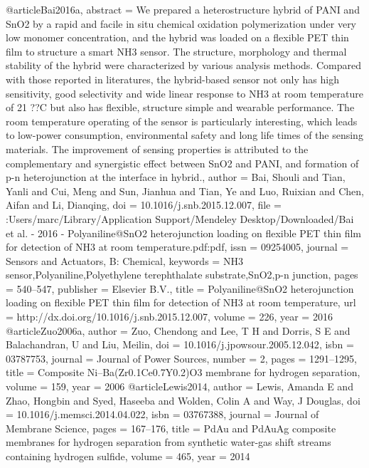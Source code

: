 @article{Bai2016a,
abstract = {We prepared a heterostructure hybrid of PANI and SnO2 by a rapid and facile in situ chemical oxidation polymerization under very low monomer concentration, and the hybrid was loaded on a flexible PET thin film to structure a smart NH3 sensor. The structure, morphology and thermal stability of the hybrid were characterized by various analysis methods. Compared with those reported in literatures, the hybrid-based sensor not only has high sensitivity, good selectivity and wide linear response to NH3 at room temperature of 21 ??C but also has flexible, structure simple and wearable performance. The room temperature operating of the sensor is particularly interesting, which leads to low-power consumption, environmental safety and long life times of the sensing materials. The improvement of sensing properties is attributed to the complementary and synergistic effect between SnO2 and PANI, and formation of p-n heterojunction at the interface in hybrid.},
author = {Bai, Shouli and Tian, Yanli and Cui, Meng and Sun, Jianhua and Tian, Ye and Luo, Ruixian and Chen, Aifan and Li, Dianqing},
doi = {10.1016/j.snb.2015.12.007},
file = {:Users/marc/Library/Application Support/Mendeley Desktop/Downloaded/Bai et al. - 2016 - Polyaniline@SnO2 heterojunction loading on flexible PET thin film for detection of NH3 at room temperature.pdf:pdf},
issn = {09254005},
journal = {Sensors and Actuators, B: Chemical},
keywords = {NH3 sensor,Polyaniline,Polyethylene terephthalate substrate,SnO2,p-n junction},
pages = {540--547},
publisher = {Elsevier B.V.},
title = {{Polyaniline@SnO2 heterojunction loading on flexible PET thin film for detection of NH3 at room temperature}},
url = {http://dx.doi.org/10.1016/j.snb.2015.12.007},
volume = {226},
year = {2016}
}
@article{Zuo2006a,
author = {Zuo, Chendong and Lee, T H and Dorris, S E and Balachandran, U and Liu, Meilin},
doi = {10.1016/j.jpowsour.2005.12.042},
isbn = {03787753},
journal = {Journal of Power Sources},
number = {2},
pages = {1291--1295},
title = {{Composite Ni–Ba(Zr0.1Ce0.7Y0.2)O3 membrane for hydrogen separation}},
volume = {159},
year = {2006}
}
@article{Lewis2014,
author = {Lewis, Amanda E and Zhao, Hongbin and Syed, Haseeba and Wolden, Colin A and Way, J Douglas},
doi = {10.1016/j.memsci.2014.04.022},
isbn = {03767388},
journal = {Journal of Membrane Science},
pages = {167--176},
title = {{PdAu and PdAuAg composite membranes for hydrogen separation from synthetic water-gas shift streams containing hydrogen sulfide}},
volume = {465},
year = {2014}
}
